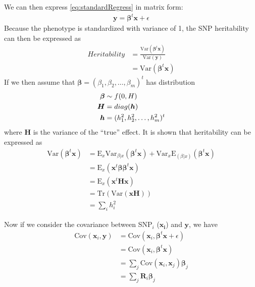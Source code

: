 \documentclass[12pt]{scrbook}
\begin{document}
We can then express \cref{eq:standardRegress} in matrix form:
\begin{align}
\boldsymbol{y}=\boldsymbol{\beta}^t\boldsymbol{x}+\epsilon
\label{eq:matrixRegress}
\end{align}
Because the phenotype is standardized with variance of 1, the \gls{SNP} heritability can then be expressed as
\begin{align}
Heritability& = \frac{\mathrm{Var}(\boldsymbol{\beta}^t\boldsymbol{x})}{\mathrm{Var}(\boldsymbol{y})} \nonumber\\
&=\mathrm{Var}(\boldsymbol{\beta}^t\boldsymbol{x})
\end{align}
If we then assume that $\boldsymbol{\beta} = (\beta_1, \beta_2,\dots,\beta_m)^t$ has distribution
\begin{align*}
\boldsymbol{\beta}&\sim f(0,\boldmath{H})\\
\boldsymbol{H}&=diag(\boldsymbol{h})\\
\boldsymbol{h}&=(h_1^2,h_2^2,\dots,h_m^2)^t
\end{align*}
where $\boldsymbol{H}$ is the variance of the ``true'' effect. 
It is shown that heritability can be expressed as %
\begin{align}
\mathrm{Var}(\boldsymbol{\beta}^t\boldsymbol{x}) &= \mathrm{E}_x\mathrm{Var}_{\beta|x}(\boldsymbol{\beta}^t\boldsymbol{x})+\mathrm{Var}_x\mathrm{E}_{(\beta|x)}(\boldsymbol{\beta}^t\boldsymbol{x}) \nonumber\\
&=\mathrm{E}_x(\boldsymbol{x}^t\boldsymbol{\beta\beta}^t\boldsymbol{x}) \nonumber\\ 
&= \mathrm{E}_x(\boldsymbol{x}^t\boldsymbol{Hx}) \nonumber\\
&=\mathrm{Tr}(\mathrm{Var}(\boldsymbol{x}\boldsymbol{H})) \nonumber\\
&=\sum_ih_i^2
\label{eq:proveHerit}
\end{align}

Now if we consider the covariance between \gls{SNP}$_i$ ($\boldsymbol{x_i}$) and $\boldsymbol{y}$, we have
\begin{align}
\mathrm{Cov}(\boldsymbol{x}_i,\boldsymbol{y}) &= \mathrm{Cov}(\boldsymbol{x}_i,\boldsymbol{\beta}^t\boldsymbol{x}+\epsilon) \nonumber\\
&=\mathrm{Cov}(\boldsymbol{x}_i,\boldsymbol{\beta}^t\boldsymbol{x}) \nonumber\\
&=\sum_j{\mathrm{Cov}(\boldsymbol{x}_i,\boldsymbol{x}_j)\boldsymbol{\beta}_j} \nonumber\\
&=\sum_j{\boldsymbol{R}_i\boldsymbol{\beta}_j}
\label{eq:covPhenoTrue}
\end{align}
\end{document}
